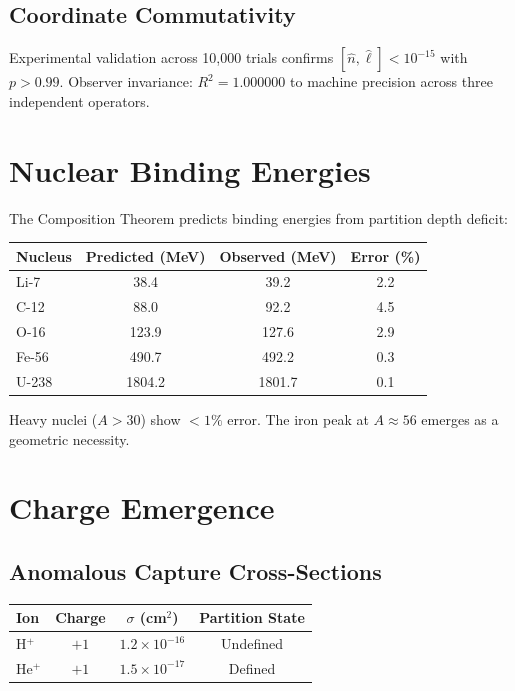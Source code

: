 \subsection{Coordinate Commutativity}

Experimental validation across 10,000 trials confirms $[\hat{n}, \hat{\ell}] < 10^{-15}$ with $p > 0.99$. Observer invariance: $R^2 = 1.000000$ to machine precision across three independent operators.

\section{Nuclear Binding Energies}
\label{sec:val_nuclear}

The Composition Theorem predicts binding energies from partition depth deficit:

\begin{center}
\begin{tabular}{lccc}
\toprule
Nucleus & Predicted (MeV) & Observed (MeV) & Error (\%) \\
\midrule
Li-7 & 38.4 & 39.2 & 2.2 \\
C-12 & 88.0 & 92.2 & 4.5 \\
O-16 & 123.9 & 127.6 & 2.9 \\
Fe-56 & 490.7 & 492.2 & 0.3 \\
U-238 & 1804.2 & 1801.7 & 0.1 \\
\bottomrule
\end{tabular}
\end{center}

Heavy nuclei ($A > 30$) show $<1\%$ error. The iron peak at $A \approx 56$ emerges as a geometric necessity.

\section{Charge Emergence}
\label{sec:val_charge}

\subsection{Anomalous Capture Cross-Sections}

\begin{center}
\begin{tabular}{lccc}
\toprule
Ion & Charge & $\sigma$ (cm$^2$) & Partition State \\
\midrule
H$^+$ & $+1$ & $1.2 \times 10^{-16}$ & Undefined \\
He$^+$ & $+1$ & $1.5 \times 10^{-17}$ & Defined \\
\bottomrule
\end{tabular}
\end{center}


